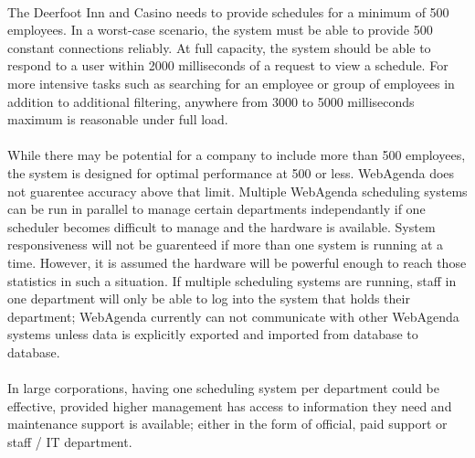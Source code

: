\documentclass[letterpaper,12pt]{report}
\begin{document}
\paragraph*{}
\hspace{0.6cm}The Deerfoot Inn and Casino needs to provide schedules for a minimum of 500 employees. In a worst-case scenario, the system must be able to provide 500 constant connections reliably. At full capacity, the system should be able to respond to a user within 2000 milliseconds of a request to view a schedule. For more intensive tasks such as searching for an employee or group of employees in addition to additional filtering, anywhere from 3000 to 5000 milliseconds maximum is reasonable under full load. 
\paragraph*{}\hspace{0.6cm}While there may be potential for a company to include more than 500 employees, the system is designed for optimal performance at 500 or less. WebAgenda does not guarentee accuracy above that limit. Multiple WebAgenda scheduling systems can be run in parallel to manage certain departments independantly if one scheduler becomes difficult to manage and the hardware is available. System responsiveness will not be guarenteed if more than one system is running at a time. However, it is assumed the hardware will be powerful enough to reach those statistics in such a situation. If multiple scheduling systems are running, staff in one department will only be able to log into the system that holds their department; WebAgenda currently can not communicate with other WebAgenda systems unless data is explicitly exported and imported from database to database. 
\paragraph*{}\hspace{0.6cm}In large corporations, having one scheduling system per department could be effective, provided higher management has access to information they need and maintenance support is available; either in the form of official, paid support or staff / IT department.
\end{document}
